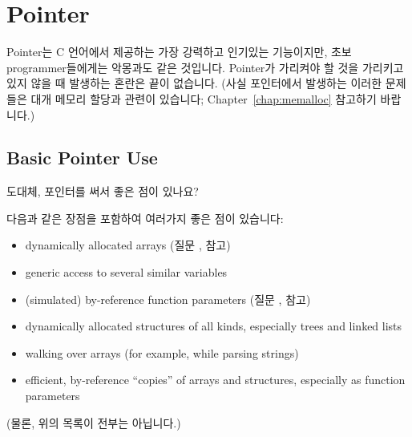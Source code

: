 \chapter{Pointer}	\label{chap:pointer}

Pointer는 C 언어에서 제공하는 가장 강력하고 인기있는 기능이지만,
초보 programmer들에게는 악몽과도 같은 것입니다.
Pointer가 가리켜야 할 것을 가리키고 있지 않을 때 발생하는 혼란은
끝이 없습니다. (사실 포인터에서 발생하는 이러한 문제들은 대개
메모리 할당과 관련이 있습니다; Chapter~\ref{chap:memalloc} 참고하기 바랍니다.)


\section{Basic Pointer Use}

\begin{faq}
	도대체, 포인터를 써서 좋은 점이 있나요?

\A
	다음과 같은 장점을 포함하여 여러가지 좋은 점이 있습니다:
\begin{itemize}
\item
	dynamically allocated arrays (질문 ,  참고)
\item
	generic access to several similar variables
\item
	(simulated) by-reference function parameters (질문 ,  참고)
\item
	dynamically allocated structures of all kinds, especially
	trees and linked lists
\item
	walking over arrays (for example, while parsing strings)
\item
	efficient, by-reference ``copies'' of arrays and structures,
	especially as function parameters
\end{itemize}

	(물론, 위의 목록이 전부는 아닙니다.)

\end{faq}

